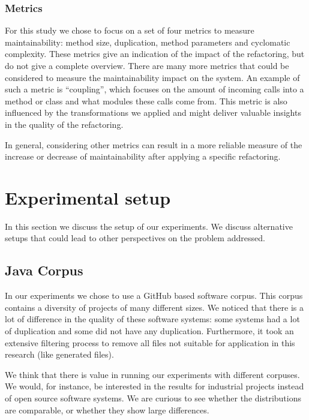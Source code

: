 \subsubsection{Metrics}
For this study we chose to focus on a set of four metrics to measure maintainability: method size, duplication, method parameters and cyclomatic complexity. These metrics give an indication of the impact of the refactoring, but do not give a complete overview. There are many more metrics that could be considered to measure the maintainability impact on the system. An example of such a metric is ``coupling'', which focuses on the amount of incoming calls into a method or class and what modules these calls come from. This metric is also influenced by the transformations we applied and might deliver valuable insights in the quality of the refactoring.

In general, considering other metrics can result in a more reliable measure of the increase or decrease of maintainability after applying a specific refactoring.

\section{Experimental setup}%
In this section we discuss the setup of our experiments. We discuss alternative setups that could lead to other perspectives on the problem addressed.

\subsection{Java Corpus}
In our experiments we chose to use a GitHub based software corpus. This corpus contains a diversity of projects of many different sizes. We noticed that there is a lot of difference in the quality of these software systems: some systems had a lot of duplication and some did not have any duplication. Furthermore, it took an extensive filtering process to remove all files not suitable for application in this research (like generated files).

We think that there is value in running our experiments with different corpuses. We would, for instance, be interested in the results for industrial projects instead of open source software systems. We are curious to see whether the distributions are comparable, or whether they show large differences.

